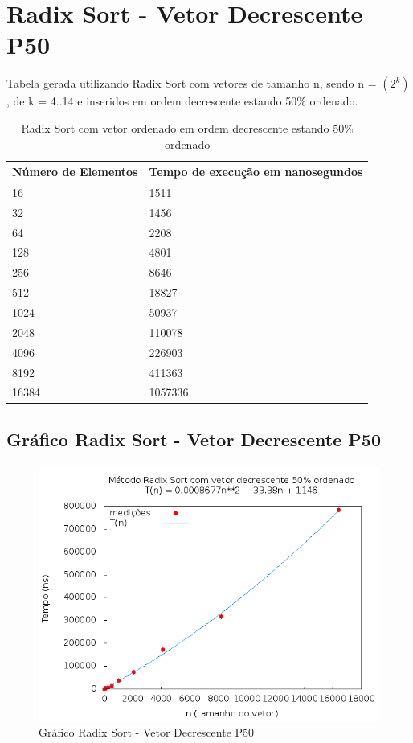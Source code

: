 \documentclass[12pt,a4paper,twoside]{report}
\begin{document}
\section{Radix Sort - Vetor Decrescente P50}
Tabela gerada utilizando Radix Sort com vetores de tamanho n, sendo n = $(2^k)$, de k = 4..14 e inseridos em ordem decrescente estando 50\% ordenado.
\begin{table}[H]
\centering
\caption{Radix Sort com vetor ordenado em ordem decrescente estando 50\% ordenado}
\label{my-label}
\begin{tabular}{|l|l|}
\hline
\multicolumn{1}{|c|}{\textbf{Número de Elementos}} & \multicolumn{1}{c|}{\textbf{Tempo de execução em nanosegundos}} \\ \hline
16 & 1511 \\ \hline
32 & 1456 \\ \hline
64 & 2208 \\ \hline
128 & 4801 \\ \hline
256 & 8646 \\ \hline
512 & 18827 \\ \hline
1024 & 50937 \\ \hline
2048 & 110078 \\ \hline
4096 & 226903 \\ \hline
8192 & 411363 \\ \hline
16384 & 1057336 \\ \hline
\end{tabular}
\end{table}

\subsection{Gráfico Radix Sort - Vetor Decrescente P50}
\begin{figure}[H]
    \centering
    \includegraphics[width=0.7\linewidth]{graficos/RadixSort/vIntDecrescenteP50/vIntDecrescenteP50.png}
  \caption{Gráfico Radix Sort - Vetor Decrescente P50}
\end{figure}
\end{document}
